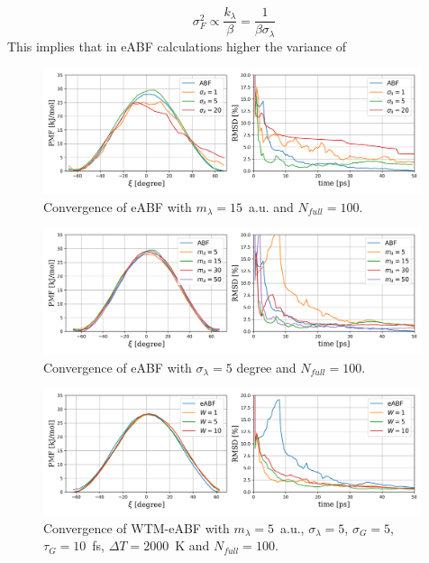 \begin{equation}
    \sigma_F^2 \propto \frac{k_\lambda}{\beta} = \frac{1}{\beta\sigma_\lambda}
\end{equation}
This implies that in eABF calculations higher the variance of
\begin{figure}[H]
  \centering
    \includegraphics[width=0.99\textwidth]{bilder/benchmark/eABF_benchmark_sigma}
   \caption{Convergence of eABF with $m_\lambda=15$~a.u. and $N_{full}=100$.}
   \label{fig:conf eABF sigma}
\end{figure}

\begin{figure}[H]
  \centering
    \includegraphics[width=0.99\textwidth]{bilder/benchmark/eABF_benchmark_mass}
   \caption{Convergence of eABF with $\sigma_\lambda=5$ degree and $N_{full}=100$.}
   \label{fig:conf eABF mass}
\end{figure}

\begin{figure}[H]
  \centering
    \includegraphics[width=0.99\textwidth]{bilder/benchmark/meta_eABF_benchmark_height}
   \caption{Convergence of WTM-eABF with $m_\lambda=5$~a.u., $\sigma_\lambda=5$, $\sigma_G=5$, $\tau_G=10$~fs, $\Delta T=2000$~K and $N_{full}=100$.}
   \label{fig:conf meABF height}
\end{figure}

